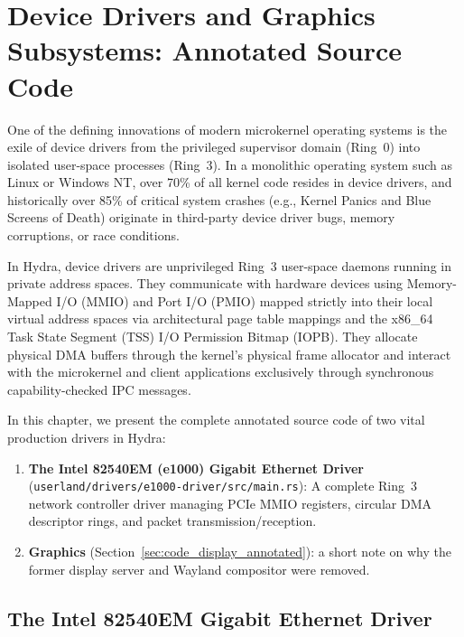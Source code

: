 \chapter{Device Drivers and Graphics Subsystems: Annotated Source Code}
\label{chap:source_drivers}

One of the defining innovations of modern microkernel operating systems is the exile of device drivers from the privileged supervisor domain (Ring~0) into isolated user-space processes (Ring~3). In a monolithic operating system such as Linux or Windows NT, over 70\% of all kernel code resides in device drivers, and historically over 85\% of critical system crashes (e.g., Kernel Panics and Blue Screens of Death) originate in third-party device driver bugs, memory corruptions, or race conditions.

In Hydra, device drivers are unprivileged Ring~3 user-space daemons running in private address spaces. They communicate with hardware devices using Memory-Mapped I/O (MMIO) and Port I/O (PMIO) mapped strictly into their local virtual address spaces via architectural page table mappings and the x86\_64 Task State Segment (TSS) I/O Permission Bitmap (IOPB). They allocate physical DMA buffers through the kernel's physical frame allocator and interact with the microkernel and client applications exclusively through synchronous capability-checked IPC messages.

In this chapter, we present the complete annotated source code of two vital production drivers in Hydra:
\begin{enumerate}
    \item \textbf{The Intel 82540EM (e1000) Gigabit Ethernet Driver} (\texttt{userland/drivers/e1000-driver/src/main.rs}): A complete Ring~3 network controller driver managing PCIe MMIO registers, circular DMA descriptor rings, and packet transmission/reception.
    \item \textbf{Graphics} (Section~\ref{sec:code_display_annotated}): a short note on why the former display server and Wayland compositor were removed.
\end{enumerate}

\section{The Intel 82540EM Gigabit Ethernet Driver}
\label{sec:code_e1000_annotated}

